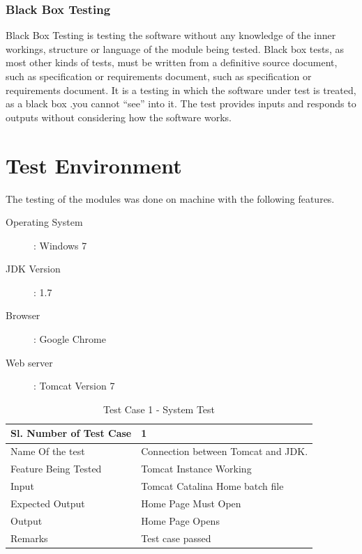 \documentclass[12pt,a4paper]{report}
\begin{document}
\subsubsection{Black Box Testing}
Black Box Testing is testing the software without any knowledge of the inner
workings, structure or language of the module being tested. Black box tests, as most
other kinds of tests, must be written from a definitive source document, such as
specification or requirements document, such as specification or requirements
document. It is a testing in which the software under test is treated, as a black box
.you cannot “see” into it. The test provides inputs and responds to outputs without
considering how the software works.
\section{Test Environment}
The testing of the modules was done on machine with the following features.
\begin{description}
  \item[Operating System ] : Windows 7 
  \item[JDK Version ] : 1.7 
  \item[Browser ] : Google Chrome 
  \item[Web server ]: Tomcat Version 7 
\end{description}
\newpage


\begin{table}
    \begin{tabular}{|l|l|}
    \hline
    Sl. Number of Test Case & 1                                  \\ \hline
    Name Of the test        & Connection between Tomcat and JDK. \\ \hline
    Feature Being Tested    & Tomcat Instance Working            \\ \hline
    Input                   & Tomcat Catalina Home batch file    \\ \hline
    Expected Output         & Home Page Must Open                \\ \hline
    Output                  & Home Page Opens                    \\ \hline
    Remarks                 & Test case passed                   \\ \hline
    \end{tabular}
    \caption {Test Case 1 - System Test}
\end{table}
\end{document}
